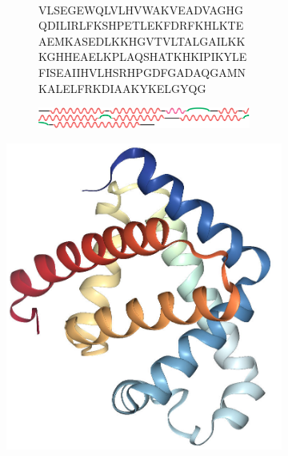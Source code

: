\documentclass[a4paper, tikz]{article}
\newcommand{\qihao}{\fontsize{5.25pt}{\baselineskip}\selectfont}    %
\begin{document}
\begin{figure}[htbp]
\begin{subfigure}{0.5\textwidth}
	\centering
	\begin{subfigure}{1\textwidth}
		{\qihao%
  		\quad\\
  		VLS\textcolor[RGB]{255,0,0}{EGEWQLV\quad LHVWAKVEA}\textcolor[RGB]{0,155,0}{D}\quad \textcolor[RGB]{255,0,0}{VAGHGQDILI\quad RLFKS}H\textcolor[RGB]{255,0,0}{PETL}\quad \textcolor[RGB]{0,155,0}{EK}F\textcolor[RGB]{0,155,0}{DRFKH}LK\quad \textcolor[RGB]{0,155,0}{T}\textcolor[RGB]{255,0,0}{EAEMKA}S\textcolor[RGB]{255,0,0}{ED\quad LKKHGVTVLT\quad ALGAIL}\textcolor[RGB]{0,155,0}{KKKG}\quad HH\textcolor[RGB]{255,0,0}{EAELKPLA\quad QSHAT}\textcolor[RGB]{0,155,0}{KH}KIP\quad \textcolor[RGB]{255,0,0}{IKYLEFISEA\quad IIHVLHSR}\textcolor[RGB]{0,155,0}{HP\quad GDF}G\textcolor[RGB]{255,0,0}{ADAQGA\quad MNKALELFRK\quad DIAAKYKEL}\textcolor[RGB]{0,155,0}{G}\quad YQG\quad}
  		\caption{}
	\end{subfigure}
	\newline\newline\newline
	\begin{subfigure}{1\textwidth}
  		\centering
  		\includegraphics[width=\linewidth, trim=7 4 7 4,clip]{pic/105M_ss.png}
  		\caption{}
	\end{subfigure}
\end{subfigure}
\begin{subfigure}{.25\textwidth}
  \centering
  \includegraphics[height=.8\linewidth]{pic/105M_ts.jpg}

\end{subfigure}
\end{figure}
\end{document}
